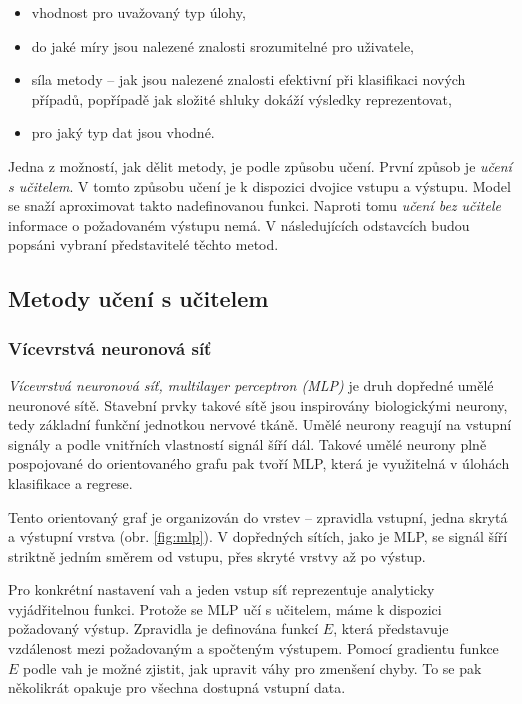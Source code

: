 \documentclass[thesis=M,czech]{FITthesis}[2012/06/26]
\begin{document}
\begin{itemize}
\item vhodnost pro uvažovaný typ úlohy,
\item do jaké míry jsou nalezené znalosti srozumitelné pro uživatele,
\item síla metody -- jak jsou nalezené znalosti efektivní při klasifikaci nových případů, popřípadě jak složité shluky dokáží výsledky reprezentovat,
\item pro jaký typ dat jsou vhodné.
\end{itemize}


Jedna z možností, jak dělit metody, je podle způsobu učení. První způsob je \textit{učení s učitelem}. V tomto způsobu učení je k dispozici dvojice vstupu a výstupu. Model se snaží aproximovat takto nadefinovanou funkci. Naproti tomu \textit{učení bez učitele} informace o požadovaném výstupu nemá. V následujících odstavcích budou popsáni vybraní představitelé těchto metod.\cite{eurokomise}

 \subsection{Metody učení s učitelem}
  \subsubsection*{Vícevrstvá neuronová síť}
    \textit{Vícevrstvá neuronová síť, multilayer perceptron (MLP)} je druh dopředné umělé neuronové sítě.
Stavební prvky takové sítě jsou inspirovány biologickými neurony, tedy základní funkční jednotkou nervové tkáně. Umělé neurony reagují na vstupní signály a podle vnitřních vlastností signál šíří dál. Takové umělé neurony plně pospojované do orientovaného grafu pak tvoří MLP, která je využitelná v úlohách klasifikace a regrese. 

Tento orientovaný graf je organizován do vrstev -- zpravidla vstupní, jedna skrytá a výstupní vrstva (obr. \ref{fig:mlp}). V dopředných sítích, jako je MLP, se signál šíří striktně jedním směrem od vstupu, přes skryté vrstvy až po výstup. 

Pro konkrétní nastavení vah a jeden vstup síť reprezentuje analyticky vyjádřitelnou funkci. Protože se MLP učí s učitelem, máme k dispozici požadovaný výstup. Zpravidla je definována funkcí $E$, která představuje vzdálenost mezi požadovaným a spočteným výstupem. Pomocí gradientu funkce $E$ podle vah je možné zjistit, jak upravit váhy pro zmenšení chyby. To se pak několikrát opakuje pro všechna dostupná vstupní data. 
\end{document}

